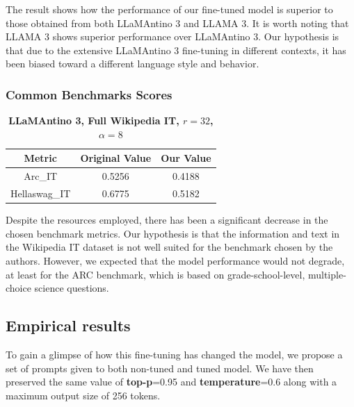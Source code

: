 \documentclass{article}
\begin{document}
	The result shows how the performance of our fine-tuned model is superior to those obtained from both LLaMAntino 3 and LLAMA 3. It is worth noting that LLAMA 3 shows superior performance over LLaMAntino 3. Our hypothesis is that due to the extensive LLaMAntino 3 fine-tuning in different contexts, it has been biased toward a different language style and behavior.  
	
	\subsubsection{Common Benchmarks Scores}
	\begin{table}[h]
		\center
		\begin{tabular}{ccc}
			\toprule
			\textbf{Metric} & \textbf{Original Value} & \textbf{Our Value} \\
			\midrule
			Arc\_IT & 0.5256 & 0.4188 \\
			Hellaswag\_IT &	0.6775 & 0.5182 \\
			\bottomrule
		\end{tabular}
		\caption{\textbf{LLaMAntino 3, Full Wikipedia IT, $r=32$, $\alpha=8$}}
	\end{table} 
	
	Despite the resources employed, there has been a significant decrease in the chosen benchmark metrics. Our hypothesis is that the information and text in the Wikipedia IT dataset is not well suited for the benchmark chosen by the authors. However, we expected that the model performance would not degrade, at least for the ARC benchmark, which is based on grade-school-level, multiple-choice science questions.
	
	\subsection{Empirical results}
	To gain a glimpse of how this fine-tuning has changed the model, we propose a set of prompts given to both non-tuned and tuned model. We have then preserved the same value of \textbf{top-p}=0.95 and \textbf{temperature}=0.6 along with a maximum output size of 256 tokens. \\
	
\end{document}
